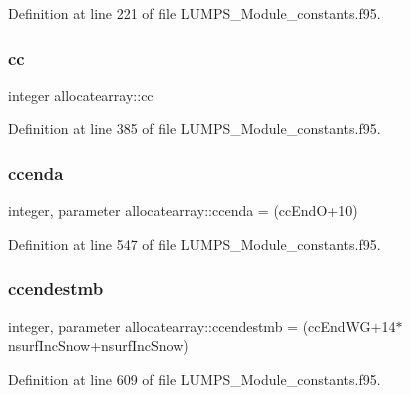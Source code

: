 Definition at line 221 of file L\+U\+M\+P\+S\+\_\+\+Module\+\_\+constants.\+f95.

\mbox{\label{namespaceallocatearray_ac863c81704eb507dee10f5e10741e10c}} 
\subsubsection{\texorpdfstring{cc}{cc}}
{\footnotesize\ttfamily integer allocatearray\+::cc}



Definition at line 385 of file L\+U\+M\+P\+S\+\_\+\+Module\+\_\+constants.\+f95.

\mbox{\label{namespaceallocatearray_a46bae68e8ba9e3b02713186773f60f5c}} 
\subsubsection{\texorpdfstring{ccenda}{ccenda}}
{\footnotesize\ttfamily integer, parameter allocatearray\+::ccenda = (cc\+EndO+10)}



Definition at line 547 of file L\+U\+M\+P\+S\+\_\+\+Module\+\_\+constants.\+f95.

\mbox{\label{namespaceallocatearray_a4a8540d91a102b456a0b5064dcf32db1}} 
\subsubsection{\texorpdfstring{ccendestmb}{ccendestmb}}
{\footnotesize\ttfamily integer, parameter allocatearray\+::ccendestmb = (cc\+End\+WG+14$\ast$nsurf\+Inc\+Snow+nsurf\+Inc\+Snow)}



Definition at line 609 of file L\+U\+M\+P\+S\+\_\+\+Module\+\_\+constants.\+f95.

\mbox{\label{namespaceallocatearray_a97f946b42822d53377b7f67e337eac42}} 
